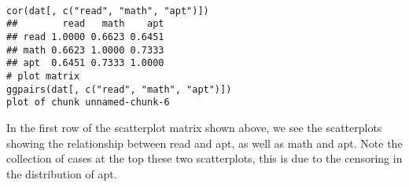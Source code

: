 \documentclass{beamer}
\begin{document}
\begin{frame}[fragile]
\begin{verbatim}

cor(dat[, c("read", "math", "apt")])
##        read   math    apt
## read 1.0000 0.6623 0.6451
## math 0.6623 1.0000 0.7333
## apt  0.6451 0.7333 1.0000
# plot matrix
ggpairs(dat[, c("read", "math", "apt")])
plot of chunk unnamed-chunk-6
\end{verbatim}
\end{frame}
\begin{frame}[fragile]
In the first row of the scatterplot matrix shown above, we see the scatterplots showing the relationship between read and apt, as well as math and apt. Note the collection of cases at the top these two scatterplots, this is due to the censoring in the distribution of apt.

\end{frame}
\end{document}
